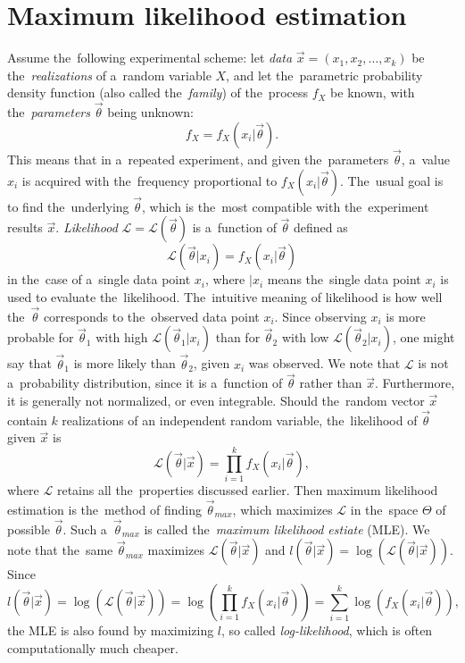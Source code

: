 \section{Maximum likelihood estimation} \label{ch:mle}

Assume the~following experimental scheme: let \textit{data} $\vec{x} = (x_1, x_2, \dots , x_k)$ be the~\textit{realizations} of a~random variable $X$, and let the~parametric probability density function (also called the~\textit{family}) of the~process $f_X$ be known, with the~\textit{parameters} $\vec{\theta}$ being unknown:
\begin{equation}
    f_X = f_X(x_i|\vec{\theta}). \label{eq:stat_experiment}
\end{equation}
This means that in a~repeated experiment, and given the~parameters $\vec{\theta}$, a~value $x_i$ is acquired with the~frequency proportional to $f_X(x_i|\vec{\theta})$. The~usual goal is to find the~underlying $\vec{\theta}$, which is the~most compatible with the~experiment results $\vec{x}$. \textit{Likelihood} $\mathcal{L}=\mathcal{L}(\vec{\theta})$ is a~function of $\vec{\theta}$ defined as 
\begin{equation}
    \mathcal{L}(\vec{\theta}|x_i) = f_X(x_i|\vec{\theta})
\end{equation}
in the~case of a~single data point $x_i$, where $|x_i$ means the~single data point $x_i$ is used to evaluate the~likelihood. The~intuitive meaning of likelihood is how well the~$\vec{\theta}$ corresponds to the~observed data point $x_i$. Since observing $x_i$ is more probable for $\vec{\theta}_1$ with high $\mathcal{L}(\vec{\theta}_1|x_i)$ than for $\vec{\theta}_2$ with low $\mathcal{L}(\vec{\theta}_2|x_i)$, one might say that $\vec{\theta}_1$ is more likely than $\vec{\theta}_2$, given $x_i$ was observed. We note that $\mathcal{L}$ is not a~probability distribution, since it is a~function of $\vec{\theta}$ rather than $\vec{x}$. Furthermore, it is generally not normalized, or even integrable. Should the~random vector $\vec{x}$ contain $k$ realizations of an independent random variable, the~likelihood of $\vec{\theta}$ given $\vec{x}$ is 
\begin{equation}
    \mathcal{L}(\vec{\theta}|\vec{x}) = \prod_{i=1}^k f_X(x_i|\vec{\theta}),
\end{equation}
where $\mathcal{L}$ retains all the~properties discussed earlier. Then maximum likelihood estimation is the~method of finding $\vec{\theta}_{max}$, which maximizes $\mathcal{L}$ in the~space $\Theta$ of possible $\vec{\theta}$. Such a~$\vec{\theta}_{max}$ is called the~\textit{maximum likelihood estiate} (MLE). We note that the~same $\vec{\theta}_{max}$ maximizes $\mathcal{L}(\vec{\theta}|\vec{x})$ and $l(\vec{\theta}|\vec{x}) = \log \left( \mathcal{L}(\vec{\theta}|\vec{x}) \right)$. Since 
\begin{equation}
    l(\vec{\theta}|\vec{x}) = \log \left( \mathcal{L}(\vec{\theta}|\vec{x}) \right) = \log \left( \prod_{i=1}^k f_X(x_i|\vec{\theta}) \right) =  \sum_{i=1}^k \log \left( f_X(x_i|\vec{\theta}) \right),
\end{equation}
the MLE is also found by maximizing $l$, so called \textit{log-likelihood}, which is often computationally much cheaper. 

